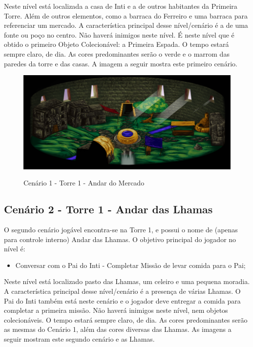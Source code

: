 \documentclass[12pt]{article}
\begin{document}
Neste nível está localizada a casa de Inti e a de outros habitantes da Primeira
Torre. Além de outros elementos, como a barraca do Ferreiro e uma barraca para
referenciar um mercado. A característica principal desse nível/cenário é a de uma
fonte ou poço no centro. Não haverá inimigos neste nível. É neste nível que é
obtido o primeiro Objeto Colecionável: a Primeira Espada. O tempo estará sempre
claro, de dia. As cores predominantes serão o verde e o marrom das paredes da torre
e das casas. A imagem a seguir mostra este primeiro cenário.

\begin{figure}[!htb]
	\centering
	\includegraphics[scale=0.4]{cenario_01.png}
	\label{fig:cenario_01}
	\caption{Cenário 1 - Torre 1 - Andar do Mercado}
\end{figure}

\newpage

\subsection{Cenário 2 - Torre 1 - Andar das Lhamas}
O segundo cenário jogável encontra-se na Torre 1, e possui o nome de (apenas
para controle interno) Andar das Lhamas. O objetivo principal do jogador no
nível é:

\begin{itemize}
    \item Conversar com o Pai do Inti - Completar Missão de levar comida para o
    Pai;
\end{itemize}

Neste nível está localizado pasto das Lhamas, um celeiro e uma pequena moradia.
A característica principal desse nível/cenário é a presença de várias Lhamas.
O Pai do Inti também está neste cenário e o jogador deve entregar a comida para
completar a primeira missão. Não haverá inimigos neste nível, nem objetos
colecionáveis. O tempo estará sempre claro, de dia. As cores predominantes serão
as mesmas do Cenário 1, além das cores diversas das Lhamas. As imagens a seguir
mostram este segundo cenário e as Lhamas.
\end{document}
